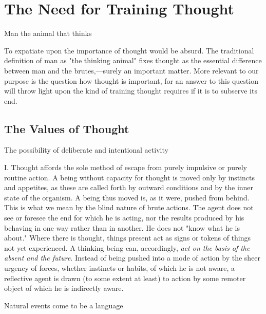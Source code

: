 \documentclass[letterpaper]{book}
\begin{document}
\chapter{The Need for Training Thought}

Man the animal that thinks

To expatiate upon the importance of thought would be absurd. The
traditional definition of man as "the thinking animal" fixes thought as
the essential difference between man and the brutes,---surely an
important matter. More relevant to our purpose is the question how
thought is important, for an answer to this question will throw light
upon the kind of training thought requires if it is to subserve its end.

\section{The Values of Thought}

The possibility of deliberate and intentional activity

I. Thought affords the sole method of escape from purely impulsive or
purely routine action. A being without capacity for thought is moved
only by instincts and appetites, as these are called forth by outward
conditions and by the inner state of the organism. A being thus moved
is, as it were, pushed from behind. This is what we mean by the blind
nature of brute actions. The agent does not see or foresee the end for
which he is acting, nor the results produced by his behaving in one way
rather than in another. He does not "know what he is about." Where there
is thought, things present act as signs or tokens of things not yet
experienced. A thinking being can, accordingly, \emph{act on the basis
of the absent and the future}. Instead of being pushed into a mode of
action by the sheer urgency of forces,
whether
instincts or habits, of which he is not aware, a reflective agent is
drawn (to some extent at least) to action by some remoter object of
which he is indirectly aware.

Natural events come to be a language
\end{document}
